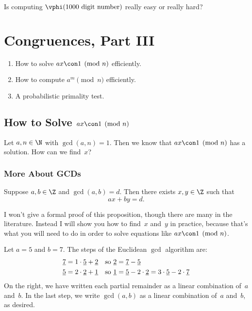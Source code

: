 \documentclass[11pt]{report}
\newcommand{\ul}[1]{\underline{#1}}
\begin{document}
\begin{question}
  Is computing $\vphi(\text{1000 digit number})$ really easy or really hard?
\end{question}





\chapter{Congruences, Part III}



\begin{enumerate}
  \item How to solve $ax\con 1\pmod{n}$ efficiently.
  \item How to compute $a^m\pmod{n}$ efficiently.
  \item A probabilistic primality test.
\end{enumerate}

\section{How to Solve $ax\con 1\pmod{n}$}
Let $a, n\in\N$ with $\gcd(a,n)=1$.  Then
we know that $ax\con 1\pmod{n}$ has a solution.  How can we find~$x$?

\subsection{More About GCDs}
\begin{proposition}
  Suppose $a,b\in\Z$ and $\gcd(a,b)=d$. Then
  there exists $x,y\in\Z$ such that
  $$
    ax + by = d.
  $$
\end{proposition}
I won't give a formal proof of this proposition, though there
are many in the literature.  Instead I will show you how to
find~$x$ and~$y$ in practice, because that's what you will
need to do in order to solve equations like
$ax\con 1\pmod{n}$.
\begin{example}
  Let $a=5$ and $b=7$.
  The steps of the Euclidean $\gcd$ algorithm are:
  \begin{align*}
    \ul{7} & =1\cdot \ul{5} + \underline{2} & \text{so } \ul{2}     & = \ul{7} - \ul{5}\hfill                                    \\
    \ul{5} & =2\cdot \ul{2} + \ul{1}        & \text{so }     \ul{1} & = \ul{5} - 2\cdot \ul{2} = 3\cdot\ul{5}-2\cdot\ul{7}\hfill
  \end{align*}
  On the right, we have written each partial remainder as a
  linear combination of~$a$ and~$b$.  In the last step, we write
  $\gcd(a,b)$ as a linear combination of~$a$ and~$b$, as desired.
\end{example}
\end{document}
